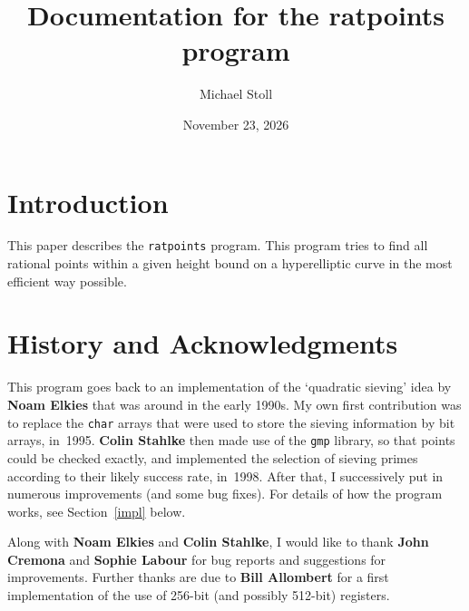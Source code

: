 \documentclass[12pt,a4paper,oneside]{amsart}
\begin{document}
\title{Documentation for the ratpoints program}

\author{Michael Stoll}
\address{Mathematisches Institut,
         Universit\"at Bayreuth,
         95440 Bayreuth, Germany.}
\date{November 23, 2026}

\maketitle


\section{Introduction}

This paper describes the \texttt{ratpoints} program. This program tries to
find all rational points within a given height bound on a hyperelliptic
curve in the most efficient way possible.


\section{History and Acknowledgments}

This program goes back to an implementation of the `quadratic sieving'
idea by \textbf{Noam Elkies} that was around in the early 1990s. My own
first contribution was to replace the \texttt{char} arrays that were used
to store the sieving information by bit arrays, in~1995. \textbf{Colin Stahlke}
then made use of the \texttt{gmp} library, so that points could be checked
exactly, and implemented the selection of sieving primes according to
their likely success rate, in~1998. After that, I successively put in
numerous improvements (and some bug fixes). For details of how the
program works, see Section~\ref{impl} below.

Along with \textbf{Noam Elkies} and \textbf{Colin Stahlke}, I would like to
thank \textbf{John Cremona} and \textbf{Sophie Labour} for bug reports and
suggestions for improvements. Further thanks are due to \textbf{Bill Allombert}
for a first implementation of the use of 256-bit (and possibly 512-bit) registers.
\end{document}
